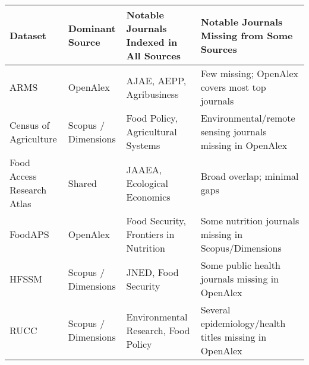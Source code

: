 \documentclass[
  letterpaper,
  DIV=11,
  numbers=noendperiod]{scrartcl}
\begin{document}
\begin{tcolorbox}[enhanced jigsaw, leftrule=.75mm, colframe=quarto-callout-note-color-frame, toprule=.15mm, titlerule=0mm, colback=white, rightrule=.15mm, opacityback=0, breakable, bottomtitle=1mm, coltitle=black, colbacktitle=quarto-callout-note-color!10!white, left=2mm, toptitle=1mm, opacitybacktitle=0.6, title=\textcolor{quarto-callout-note-color}{\faInfo}\hspace{0.5em}{Summary of Journal Coverage by Dataset}, arc=.35mm, bottomrule=.15mm]

\begin{longtable}[]{@{}
  >{\raggedright\arraybackslash}p{}
  >{\raggedright\arraybackslash}p{}
  >{\raggedright\arraybackslash}p{}
  >{\raggedright\arraybackslash}p{}@{}}
\toprule\noalign{}
\begin{minipage}[b]{\linewidth}\raggedright
Dataset
\end{minipage} & \begin{minipage}[b]{\linewidth}\raggedright
Dominant Source
\end{minipage} & \begin{minipage}[b]{\linewidth}\raggedright
Notable Journals Indexed in All Sources
\end{minipage} & \begin{minipage}[b]{\linewidth}\raggedright
Notable Journals Missing from Some Sources
\end{minipage} \\
\midrule\noalign{}
\endhead
\bottomrule\noalign{}
\endlastfoot
ARMS & OpenAlex & AJAE, AEPP, Agribusiness & Few missing; OpenAlex
covers most top journals \\
Census of Agriculture & Scopus / Dimensions & Food Policy, Agricultural
Systems & Environmental/remote sensing journals missing in OpenAlex \\
Food Access Research Atlas & Shared & JAAEA, Ecological Economics &
Broad overlap; minimal gaps \\
FoodAPS & OpenAlex & Food Security, Frontiers in Nutrition & Some
nutrition journals missing in Scopus/Dimensions \\
HFSSM & Scopus / Dimensions & JNED, Food Security & Some public health
journals missing in OpenAlex \\
RUCC & Scopus / Dimensions & Environmental Research, Food Policy &
Several epidemiology/health titles missing in OpenAlex \\
\end{longtable}

\end{tcolorbox}
\end{document}
